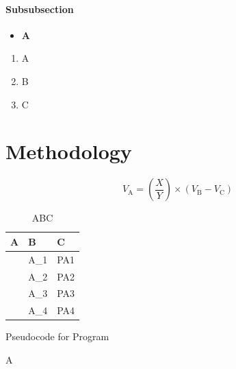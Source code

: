 \documentclass[oneside]{ecsthesis}       %
\begin{document}
\subsubsection{Subsubsection}\label{subsubsection}

\begin{itemize}
\item
  \textbf{A}
\end{itemize}

\begin{enumerate}
\def\labelenumi{\arabic{enumi}.}
\item
  A
\item
  B
\item
  C
\end{enumerate}



\chapter{Methodology}\label{methodology}

\begin{equation}
  V_{\text{A}} = \left(\frac{X}{Y}\right) \times (V_{\text{B}} - V_{\text{C}})
  \label{VoutZoom}
\end{equation}

\begin{table}[!htb]
  \centering
  \begin{tabular}{p{2.5cm} p{6cm} p{2.5cm}}
    \toprule
    \textbf{A} & \textbf{B} & \textbf{C} \\
    \midrule
    & A\_1 & PA1 \\
    & A\_2 & PA2 \\
    & A\_3 & PA3 \\
    & A\_4 & PA4 \\
    \bottomrule
  \end{tabular}
  \caption{ABC}
  \label{tab:abc}
\end{table}

\begin{algorithm}[!htb]
	\caption{Pseudocode for Program}
	\begin{algorithmic}[1] %
		\STATE A
	\end{algorithmic}
\end{algorithm}

\end{document}
